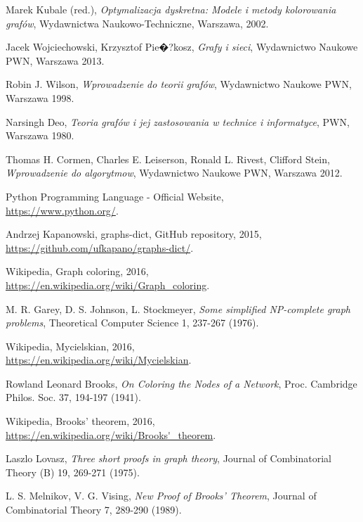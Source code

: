 \documentclass[12pt,a4paper]{mwrep}
\begin{document}
\begin{thebibliography}{99}

Marek Kubale (red.),
\emph{Optymalizacja dyskretna: Modele i metody kolorowania grafów},
Wydawnictwa Naukowo-Techniczne, Warszawa, 2002.

Jacek Wojciechowski, Krzysztof Pie�?kosz, \emph{Grafy i sieci},
Wydawnictwo Naukowe PWN, Warszawa 2013.

Robin J. Wilson, \emph{Wprowadzenie do teorii grafów},
Wydawnictwo Naukowe PWN, Warszawa 1998.

Narsingh Deo, 
\emph{Teoria grafów i jej zastosowania w technice i informatyce},
PWN, Warszawa 1980.

Thomas H. Cormen, Charles E. Leiserson, Ronald L. Rivest, Clifford Stein,
\emph{Wprowadzenie do algorytmow},
Wydawnictwo Naukowe PWN, Warszawa 2012.

Python Programming Language - Official Website,\\
\url{https://www.python.org/}.

Andrzej Kapanowski, graphs-dict, GitHub repository, 2015,\\
\url{https://github.com/ufkapano/graphs-dict/}.


Wikipedia, Graph coloring, 2016,\\
\url{https://en.wikipedia.org/wiki/Graph_coloring}.

M. R. Garey, D. S. Johnson, L. Stockmeyer, 
\emph{Some simplified NP-complete graph problems},
Theoretical Computer Science 1, 237-267 (1976).

Wikipedia, Mycielskian, 2016,\\
\url{https://en.wikipedia.org/wiki/Mycielskian}.

Rowland Leonard Brooks, 
\emph{On Coloring the Nodes of a Network},
Proc. Cambridge Philos. Soc. 37, 194-197 (1941).

Wikipedia, Brooks' theorem, 2016,\\
\url{https://en.wikipedia.org/wiki/Brooks'_theorem}.

Laszlo Lovasz,
\emph{Three short proofs in graph theory},
Journal of Combinatorial Theory (B) 19, 269-271 (1975).

L. S. Melnikov, V. G. Vising,
\emph{New Proof of Brooks' Theorem},
Journal of Combinatorial Theory 7, 289-290 (1989).


\end{thebibliography}
\end{document}
